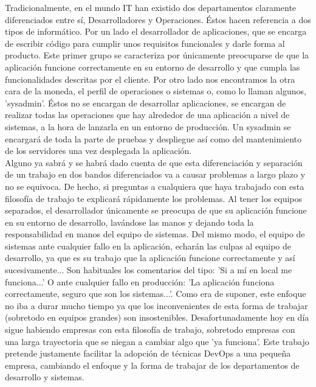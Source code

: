 \begin{text}
		Tradicionalmente, en el mundo IT han existido dos departamentos claramente diferenciados entre sí, Desarrolladores y Operaciones. Éstos hacen referencia a dos tipos de informático. Por un lado el desarrollador de aplicaciones, que se encarga de escribir código para cumplir unos requisitos funcionales y darle forma al producto. Este primer grupo se caracteriza por únicamente preocuparse de que la aplicación funcione correctamente en su entorno de desarrollo y que cumpla las funcionalidades descritas por el cliente. Por otro lado nos encontramos la otra cara de la moneda, el perfil de operaciones o sistemas o, como lo llaman algunos, 'sysadmin'. Éstos no se encargan de desarrollar aplicaciones, se encargan de realizar todas las operaciones que hay alrededor de una aplicación a nivel de sistemas, a la hora de lanzarla en un entorno de producción. Un sysadmin se encargará de toda la parte de pruebas y despliegue así como del mantenimiento de los servidores una vez desplegada la aplicación. \\
		Alguno ya sabrá y se habrá dado cuenta de que esta diferenciación y separación de un trabajo en dos bandos diferenciados va a causar problemas a largo plazo y no se equivoca. De hecho, si preguntas a cualquiera que haya trabajado con esta filosofía de trabajo te explicará rápidamente los problemas. Al tener los equipos separados, el desarrollador únicamente se preocupa de que su aplicación funcione en su entorno de desarrollo, lavándose las manos y dejando toda la responsabilidad en manos del equipo de sistemas. Del mismo modo, el equipo de sistemas ante cualquier fallo en la aplicación, echarán las culpas al equipo de desarrollo, ya que es su trabajo que la aplicación funcione correctamente y así sucesivamente... Son habituales los comentarios del tipo: 'Si a mí en local me funciona...' O ante cualquier fallo en producción: 'La aplicación funciona correctamente, seguro que son los sistemas...'. Como era de suponer, este enfoque no iba a durar mucho tiempo ya que los inconvenientes de esta forma de trabajar (sobretodo en equipos grandes) son insostenibles. Desafortunadamente hoy en día sigue habiendo empresas con esta filosofía de trabajo, sobretodo empresas con una larga trayectoria que se niegan a cambiar algo que 'ya funciona'. Este trabajo pretende justamente facilitar la adopción de técnicas DevOps a una pequeña empresa, cambiando el enfoque y la forma de trabajar de los departamentos de desarrollo y sistemas.
	\end{text}
	
